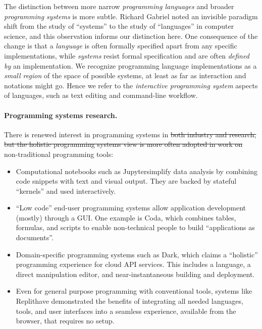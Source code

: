 \documentclass[english,submission]{programming}
\providecommand{\DIFadd}[1]{{\protect\color{blue}\uwave{#1}}} %
\providecommand{\DIFdel}[1]{{\protect\color{red}\sout{#1}}}                      %
\providecommand{\DIFaddbegin}{} %
\providecommand{\DIFaddend}{} %
\providecommand{\DIFdelbegin}{} %
\providecommand{\DIFdelend}{} %
\begin{document}
The distinction between more narrow \emph{programming languages} and
broader \emph{programming systems} is more subtle. Richard Gabriel noted
an invisible paradigm shift from the study of ``systems'' to the study
of ``languages'' in computer science\DIFaddbegin \DIFadd{~}\DIFaddend \cite{PLrev}, and this observation
informs our distinction here. One consequence of the change is that a
\emph{language} is often formally specified apart from any specific
implementations, while \emph{systems} resist formal specification and
are often \emph{defined by} an implementation. We recognize programming
language implementations as a \emph{small region} of the space of
possible systems, at least as far as interaction and notations might go.
Hence we refer to the \emph{interactive programming system} aspects of
languages, such as text editing and command-line workflow.

\paragraph{Programming systems research.}

There is renewed interest in programming systems in \DIFdelbegin \DIFdel{both industry and
research, but the holistic programming systems view is more often
adopted in work on }\DIFdelend \DIFaddbegin \DIFadd{the form of recent
}\DIFaddend non-traditional programming tools:

\begin{itemize}
\tightlist
\item
  Computational notebooks such as Jupyter\DIFaddbegin \DIFadd{~\mbox{%
\cite{Jupyter} }\hspace{0pt}%
}\DIFaddend simplify data
  analysis by combining code snippets with text and visual output. They
  are backed by stateful ``kernels'' and used interactively.
\item
  ``Low code'' end-user programming systems allow application
  development (mostly) through a GUI. One example is
  Coda\DIFaddbegin \DIFadd{~}\DIFaddend \cite{CodaWeb}, which combines tables, formulas, and scripts to
  enable non-technical people to build ``applications as documents''.
\item
  Domain-specific programming systems such as Dark\DIFaddbegin \DIFadd{~\mbox{%
\cite{DarkWeb}}\hspace{0pt}%
}\DIFaddend , which
  claims a ``holistic'' programming experience for cloud API services.
  This includes a language, a direct manipulation editor, and
  near-instantaneous building and deployment.
\item
  Even for general purpose programming with conventional tools, systems
  like Replit\DIFaddbegin \DIFadd{~\mbox{%
\cite{ReplitWeb} }\hspace{0pt}%
}\DIFaddend have demonstrated the benefits of
  integrating all needed languages, tools, and user interfaces into a
  seamless experience, available from the browser, that requires no
  setup.
\end{itemize}
\end{document}
